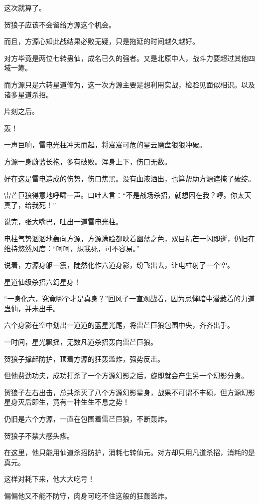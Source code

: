 \begin{this_body}
这次就算了。

贺狼子应该不会留给方源这个机会。

而且，方源心知此战结果必败无疑，只是拖延的时间越久越好。

对方毕竟是两位七转蛊仙，成名已久的强者。又是北原中人，战斗力要超过其他四域一筹。

而方源只是六转星道修为，这一次方源主要是想利用实战，检验见面似相识。以及诸多星道杀招。

片刻之后。

轰！

一声巨响，雷电光柱冲天而起，将岌岌可危的星云磨盘狠狠冲破。

方源一身蔚蓝长袍，多有破败。浑身上下，伤口无数。

好在这是雷电造成的伤势，伤口焦黑。没有血液洒出，也算帮助方源遮掩了破绽。

雷芒巨狼得意地呼啸一声。口吐人言：“不是战场杀招，就想困在我？哼。你太天真了，给我死！”

说完，张大嘴巴，吐出一道雷电光柱。

电柱气势汹汹地轰向方源，方源满脸都映着幽蓝之色，双目精芒一闪即逝，仍旧在维持悠然风度：“呵呵，想我死，可不容易。”

说着，方源身躯一震，陡然化作六道身影，纷飞出去，让电柱射了一个空。

星道仙级杀招六幻星身！

“一身化六，究竟哪个才是真身？”回风子一直观战着，因为忌惮暗中潜藏着的力道蛊仙，并未出手。

六个身影在空中划出一道道的蓝星光尾，将雷芒巨狼包围中央，齐齐出手。

一时间，星光飘摇，无数凡道杀招轰向雷芒巨狼。

贺狼子撑起防护，顶着方源的狂轰滥炸，强势反击。

但他费劲功夫，成功打杀了一个方源幻影之后，旋即就会产生另一个幻影分身。

贺狼子左右出击，总共杀灭了八个方源幻影星身，战果不可谓不丰硕，但方源幻影星身灭后即生，竟有一种生生不息之势！

仍旧是六个方源，一直在包围着雷芒巨狼，不断轰炸。

贺狼子不禁大感头疼。

在这里，他只能用仙道杀招防护，消耗七转仙元。对方却只用凡道杀招，消耗的是真元。

这样对耗下来，他大大吃亏！

偏偏他又不能不防守，肉身可吃不住这般的狂轰滥炸。


\end{this_body}
